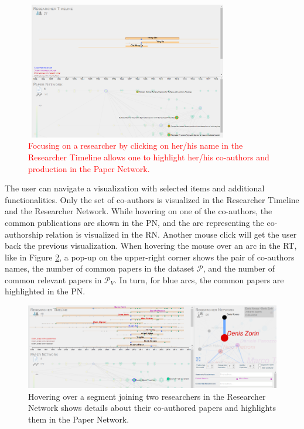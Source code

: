 \begin{figure}[!ht]
    \centering
    \includegraphics[width=0.8\textwidth, height=6cm]{fig/timeline_researcherhover_cropped.png}
    \caption{\textcolor{red}{Focusing on a researcher by clicking on her/his name in the Researcher Timeline allows one to highlight her/his co-authors and production in the Paper Network.}}%
    \label{fig:authorclick}
\end{figure}

The user can navigate a visualization with selected items and additional functionalities. Only the set of co-authors is visualized in the Researcher Timeline and the Researcher Network. While hovering on one of the co-authors, the common publications are shown in the PN, and the arc representing the co-authorship relation is visualized in the RN. Another mouse click will get the user back the previous visualization.
When hovering the mouse over an arc in the RT, like in Figure \ref{fig:researchernetwork}, a pop-up on the upper-right corner shows the pair of co-authors names, the number of common papers in the dataset $\mathcal{P}$, and the number of common relevant papers in $\mathcal{P}_{V}$. In turn, for blue arcs, the common papers are highlighted in the PN. 

\begin{figure}[!ht]
    \centering
    \includegraphics[width=\textwidth]{fig/researchernetwork.png}
    \caption{Hovering over a segment joining two researchers in the Researcher Network shows details about their co-authored papers and highlights them in the Paper Network.}
    \label{fig:researchernetwork}
    \end{figure}

